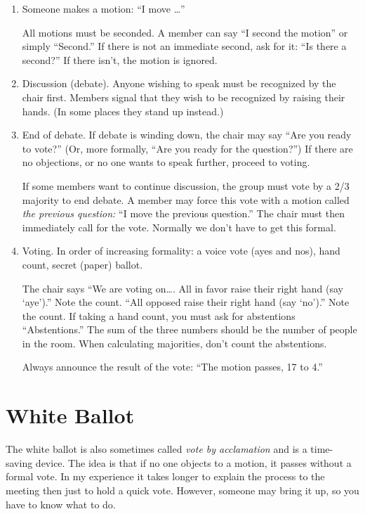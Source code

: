 \begin{enumerate}
\item
Someone makes a motion: ``I move \ldots''

All motions must be seconded.
A member can say ``I second the motion'' or simply ``Second.''
If there is not an immediate second,
ask for it: ``Is there a second?''  If there isn't, the motion is ignored.


\item
Discussion (debate).  Anyone wishing to speak must be recognized by the chair
first.  Members signal that they wish to be recognized by raising
their hands.  (In some places they stand up instead.)

\item
End of debate.  If debate is winding down, the chair may say ``Are you
ready to vote?''  (Or, more formally, ``Are you ready for the
question?'')  If there are no objections, or no one wants to speak
further, proceed to voting.

If some members want to continue discussion, the group must vote by a
2/3 majority to end debate.  A member may force this vote with a
motion called {\em the previous question:\/}  ``I move the previous question.''
The chair must then immediately call for the vote.  Normally we don't
have to get this formal.

\item
Voting.  In order of increasing formality: a voice vote (ayes and
nos), hand count, secret (paper) ballot.

The chair says ``We are voting on\ldots.  All in favor raise their
right hand (say `aye').''  Note the count.  ``All opposed raise their
right hand (say `no').''  Note the count.  If taking a hand count,
you must ask for abstentions ``Abstentions.''  The sum of the three
numbers should be the number of people in the room.  When calculating
majorities, don't count the abstentions.

Always announce the result of the vote: ``The motion passes, 17 to 4.''

\end{enumerate}

\section{White Ballot}

The white ballot is also sometimes called {\em vote by acclamation\/}
and is a time-saving device.  The idea is that if no one objects to a
motion, it passes without a formal vote.
In my experience it takes longer to explain the process to the meeting
then just to hold a quick vote.  However, someone may bring it up, so
you have to know what to do. 

